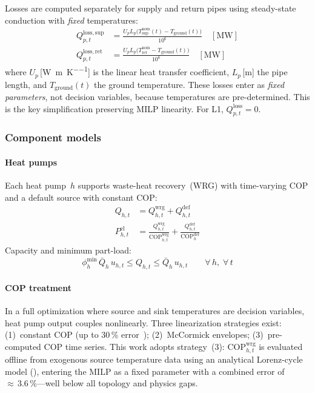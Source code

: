 \documentclass[review,3p]{elsarticle}
\begin{document}
Losses are computed separately for supply and return pipes using
steady-state conduction with \emph{fixed} temperatures:
%
\begin{align}
  Q_{p,t}^{\mathrm{loss,sup}} &= \frac{U_p L_p \bigl(
    T_{\mathrm{sup}}^{\mathrm{nom}}(t) - T_{\mathrm{ground}}(t)
    \bigr)}{10^6}
  \quad [\text{MW}]
  \label{eq:loss_supply} \\[4pt]
  Q_{p,t}^{\mathrm{loss,ret}} &= \frac{U_p L_p \bigl(
    T_{\mathrm{ret}}^{\mathrm{nom}} - T_{\mathrm{ground}}(t)
    \bigr)}{10^6}
  \quad [\text{MW}]
  \label{eq:loss_return}
\end{align}
%
where $U_p$\,[\si{\watt\per\metre\per\kelvin}] is the linear heat
transfer coefficient, $L_p$\,[m] the pipe length, and
$T_{\mathrm{ground}}(t)$ the ground temperature. These losses enter
as \emph{fixed parameters}, not decision variables, because
temperatures are pre-determined. This is the key simplification
preserving MILP linearity. For L1,
$Q_{p,t}^{\mathrm{loss}} = 0$.

\subsubsection{Component models}
\label{sec:model_components}

\paragraph{Heat pumps}
Each heat pump~$h$ supports waste-heat recovery~(WRG) with
time-varying COP and a default source with constant COP:
%
\begin{align}
  Q_{h,t} &= Q_{h,t}^{\mathrm{wrg}} + Q_{h,t}^{\mathrm{def}}
  \label{eq:hp_split} \\
  P_{h,t}^{\mathrm{el}} &= \frac{Q_{h,t}^{\mathrm{wrg}}}{
    \mathrm{COP}_{h,t}^{\mathrm{wrg}}}
    + \frac{Q_{h,t}^{\mathrm{def}}}{\mathrm{COP}_h^{\mathrm{def}}}
  \label{eq:hp_pel}
\end{align}
%
Capacity and minimum part-load:
\begin{equation}
  \phi_h^{\mathrm{min}}\, \bar{Q}_h\, u_{h,t}
  \leq Q_{h,t}
  \leq \bar{Q}_h\, u_{h,t}
  \qquad \forall\, h,\; \forall\, t
  \label{eq:hp_cap}
\end{equation}

\paragraph{COP treatment}
In a full optimization where source and sink temperatures are decision
variables, heat pump output couples nonlinearly. Three linearization
strategies exist: (1)~constant COP (up to 30\,\%
error~\cite{Ommen2016}); (2)~McCormick envelopes; (3)~pre-computed
COP time series. This work adopts strategy~(3):
$\mathrm{COP}_{h,t}^{\mathrm{wrg}}$ is evaluated offline from
exogenous source temperature data using an analytical Lorenz-cycle
model (), entering the MILP as a fixed parameter with
a combined error of ${\approx}\,3.6\,\%$---well below all topology
and physics gaps.
\end{document}
